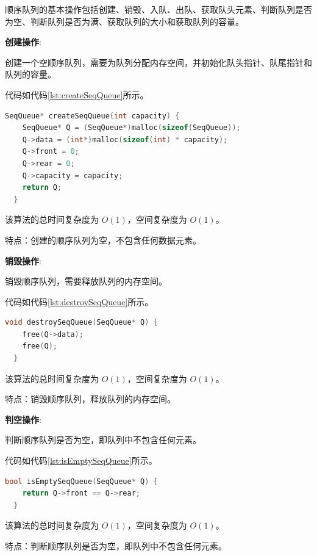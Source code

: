 \documentclass[lang=cn,newtx,10pt,scheme=chinese]{../elegantbook}
\begin{document}
顺序队列的基本操作包括创建、销毁、入队、出队、获取队头元素、判断队列是否为空、判断队列是否为满、获取队列的大小和获取队列的容量。

\textbf{创建操作}:

创建一个空顺序队列，需要为队列分配内存空间，并初始化队头指针、队尾指针和队列的容量。

代码如代码\ref{lst:createSeqQueue}所示。

\begin{lstlisting}[language=C++, caption={创建一个空顺序队列示例代码}, label={lst:createSeqQueue}]
  SeqQueue* createSeqQueue(int capacity) {
    SeqQueue* Q = (SeqQueue*)malloc(sizeof(SeqQueue));
    Q->data = (int*)malloc(sizeof(int) * capacity);
    Q->front = 0;
    Q->rear = 0;
    Q->capacity = capacity;
    return Q;
  }

\end{lstlisting}

该算法的总时间复杂度为 $O(1)$，空间复杂度为 $O(1)$。

特点：创建的顺序队列为空，不包含任何数据元素。

\textbf{销毁操作}:

销毁顺序队列，需要释放队列的内存空间。

代码如代码\ref{lst:destroySeqQueue}所示。

\begin{lstlisting}[language=C++, caption={销毁顺序队列示例代码}, label={lst:destroySeqQueue}]
  void destroySeqQueue(SeqQueue* Q) {
    free(Q->data);
    free(Q);
  }

\end{lstlisting}

该算法的总时间复杂度为 $O(1)$，空间复杂度为 $O(1)$。

特点：销毁顺序队列，释放队列的内存空间。

\textbf{判空操作}:

判断顺序队列是否为空，即队列中不包含任何元素。

代码如代码\ref{lst:isEmptySeqQueue}所示。

\begin{lstlisting}[language=C++, caption={判断顺序队列是否为空示例代码}, label={lst:isEmptySeqQueue}]
  bool isEmptySeqQueue(SeqQueue* Q) {
    return Q->front == Q->rear;
  }

\end{lstlisting}

该算法的总时间复杂度为 $O(1)$，空间复杂度为 $O(1)$。

特点：判断顺序队列是否为空，即队列中不包含任何元素。
\end{document}
